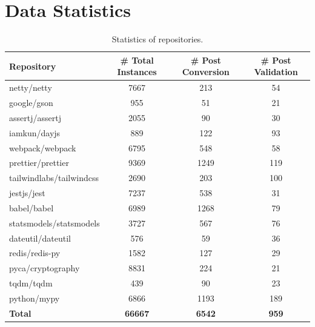 \documentclass[acmsmall,screen,review,anonymous]{acmart}
\begin{document}
\section{Data Statistics}
\begin{table}[t]
\centering
\caption{Statistics of \Swebenchx repositories.}
\footnotesize
\tabmargin
\begin{tabular}{lccc}
\toprule
\textbf{Repository} & \textbf{\# Total Instances} & \textbf{\# Post Conversion} & \textbf{\# Post Validation} \\
\midrule
netty/netty & 7667 & 213 & 54 \\
google/gson & 955 & 51 & 21 \\
assertj/assertj & 2055 & 90 & 30 \\
iamkun/dayjs & 889 & 122 & 93 \\
webpack/webpack & 6795 & 548 & 58 \\
prettier/prettier & 9369 & 1249 & 119 \\
tailwindlabs/tailwindcss & 2690 & 203 & 100 \\
jestjs/jest & 7237 & 538 & 31 \\
babel/babel & 6989 & 1268 & 79 \\
statsmodels/statsmodels & 3727 & 567 & 76 \\
dateutil/dateutil & 576 & 59 & 36 \\
redis/redis-py & 1582 & 127 & 29 \\
pyca/cryptography & 8831 & 224 & 21 \\
tqdm/tqdm & 439 & 90 & 23 \\
python/mypy & 6866 & 1193 & 189 \\
\midrule
\textbf{Total} & \textbf{66667} & \textbf{6542} & \textbf{959} \\
\bottomrule
\end{tabular}
\label{table:statistics}
\end{table}

\end{document}

